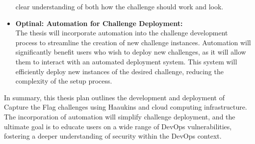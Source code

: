\documentclass[a4, 12pt]{article}
\begin{document}
\begin{itemize}
    clear understanding of both how the challenge should work and look.\cite{ctftime_event}\cite{cicdgoat_github}\cite{tryhackme_attackingdefendingvpcs}\cite{tryhackme_iampermissions}
    \item \textbf{Optinal: Automation for Challenge Deployment:}\\ The thesis will incorporate automation 
    into the challenge development process to streamline the creation of new challenge instances. 
    Automation will significantly benefit users who wish to deploy new challenges, as it will 
    allow them to interact with an automated deployment system. This system will efficiently 
    deploy new instances of the desired challenge, reducing the complexity of the setup process.\cite{haaukins-webclient}

\end{itemize}

In summary, this thesis plan outlines the development and deployment of Capture the Flag 
challenges using Haaukins and cloud computing infrastructure. The incorporation of automation 
will simplify challenge deployment, and the ultimate goal is to educate users on a wide range of 
DevOps vulnerabilities, fostering a deeper understanding of security within the DevOps context.
\end{document}
